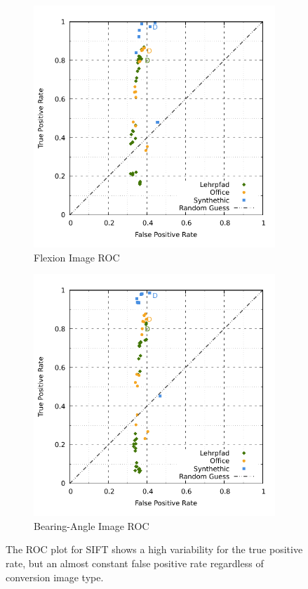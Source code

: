 \begin{figure}[H]
\begin{subfigure}[t]{0.45\linewidth}
    \includegraphics[width=\linewidth]{chapter06/results/SIFT/flexion/roc.pdf}%
    \caption{Flexion Image ROC}
\end{subfigure}\quad
\begin{subfigure}[t]{0.45\linewidth}
    \includegraphics[width=\linewidth]{chapter06/results/SIFT/bearing/roc.pdf}
    \caption{Bearing-Angle Image ROC}
\end{subfigure}
    \caption{The ROC plot for SIFT shows a high variability for the true positive rate, but an almost constant false positive rate regardless of conversion image type.}
\end{figure}
